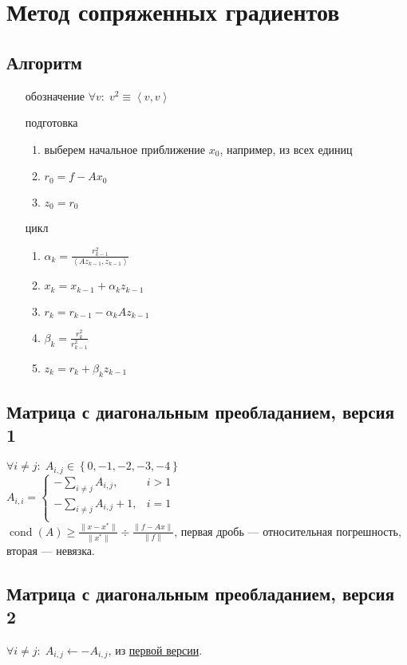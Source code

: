 \documentclass[russian, english]{article}
\newcommand{\mydot}[2]{\left\langle#1,#2\right\rangle}
\begin{document}
\section{Метод сопряженных градиентов}
\subsection{Алгоритм}
\begin{itemize}
	\item[обозначение] $\forall v:\; v^2\equiv \mydot{v}{v}$
	\item[подготовка]
		\begin{enumerate}
			\item выберем начальное приближение $x_0$, например, из всех единиц
			\item $r_0 = f - Ax_0$
			\item $z_0 = r_0$
		\end{enumerate}
	\item[цикл]
		\begin{enumerate}
			\item $\alpha_k=\frac{r_{k-1}^2}{\mydot{Az_{k-1}}{z_{k-1}}}$
			\item $x_k=x_{k-1}+\alpha_kz_{k-1}$
			\item $r_k=r_{k-1}-\alpha_kAz_{k-1}$
			\item $\beta_k=\frac{r_k^2}{r_{k-1}^2}$
			\item $z_k=r_k+\beta_kz_{k-1}$
		\end{enumerate}
\end{itemize}
\subsection{Матрица с диагональным преобладанием, версия 1}
\label{DiagonalPrMatrix1}
$\forall i\neq j:\; A_{i, j}\in\left\{0, -1, -2, -3, -4\right\}$\\
$A_{i,i}=\begin{cases}
-\sum_{i\neq j}A_{i, j}, & i > 1\\
-\sum_{i\neq j}A_{i, j} + 1, & i = 1\\
\end{cases}$\\
$\operatorname{cond}(A) \ge \frac{\|x-x^*\|}{\|x^*\|}\div\frac{\|f-Ax\|}{\|f\|}$, первая дробь --- относительная погрешность, вторая --- невязка.

\subsection{Матрица с диагональным преобладанием, версия 2}
$\forall i\neq j:\;A_{i, j}\leftarrow -A_{i, j}$, из \hyperref[DiagonalPrMatrix1]{первой версии}.
\end{document}
